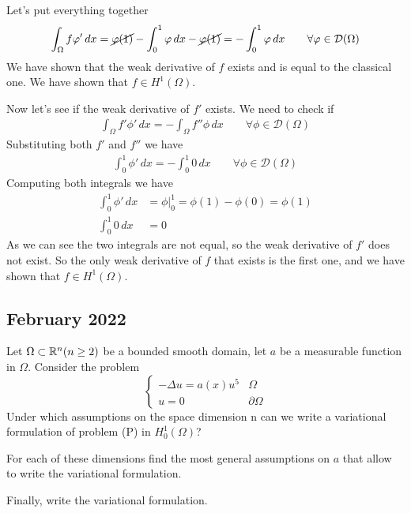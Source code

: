 Let's put everything together
\[
    \begin{split}
        \int_\Omega f \phi' \, dx = \cancel{\phi(1)} - \int_0^1 \phi \, dx - \cancel{\phi(1)} = - \int_0^1 \phi \, dx \qquad \forall \phi \in \mathcal{D}(\Omega)
    \end{split}
\]
We have shown that the weak derivative of \(f\) exists and is equal to the classical one. We have shown that \(f \in H^1(\Omega)\).

Now let's see if the weak derivative of \(f'\) exists. We need to check if
\[
    \begin{split}
        \int_\Omega f' \phi' \, dx = - \int_\Omega f'' \phi \, dx \qquad \forall \phi \in \mathcal{D}(\Omega)
    \end{split}
\]
Substituting both \(f'\) and \(f''\) we have
\[
    \begin{split}
        \int_0^1 \phi' \, dx = - \int_0^1 0 \, dx \qquad \forall \phi \in \mathcal{D}(\Omega)
    \end{split}
\]
Computing both integrals we have
\begin{align*}
    \int_0^1 \phi' \, dx &= \left. \phi \right|_0^1 = \phi(1) - \phi(0) = \phi(1) \\
    \int_0^1 0 \, dx &= 0
\end{align*}
As we can see the two integrals are not equal, so the weak derivative of \(f'\) does not exist. So the only weak derivative of \(f\) that exists is the first one, and we have shown that \(f \in H^1(\Omega)\).

\newpage
\subsection{February 2022}
\begin{exercise}
    Let \(\Omega \subset \real^n (n \geq 2)\) be a bounded smooth domain, let \(a\) be a measurable function in \(\Omega\).
    Consider the problem
    \[
        \begin{cases}
            - \Delta u = a(x) u^5 & \Omega \\
            u = 0 & \partial\Omega
        \end{cases}
        \tag*{(P)}
    \]
    Under which assumptions on the space dimension n can we write a variational formulation of problem (P) in
    \(H^1_0(\Omega)\)? 
    
    For each of these dimensions find the most general assumptions on \(a\) that allow to write the variational formulation. 
    
    Finally, write the variational formulation.
    \end{exercise}

